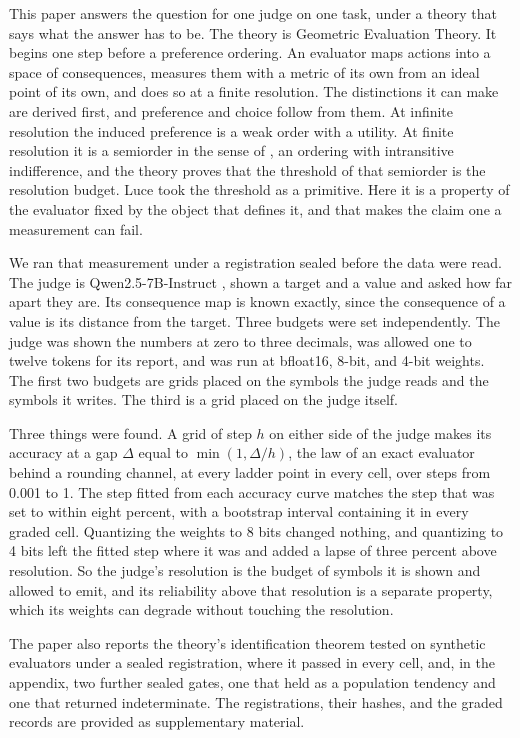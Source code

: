 \documentclass{article}
\theoremstyle{definition}
\theoremstyle{remark}
\begin{document}
This paper answers the question for one judge on one task, under a theory that says what the answer has to be.
The theory is Geometric Evaluation Theory.
It begins one step before a preference ordering.
An evaluator maps actions into a space of consequences, measures them with a metric of its own from an ideal point of its own, and does so at a finite resolution.
The distinctions it can make are derived first, and preference and choice follow from them.
At infinite resolution the induced preference is a weak order with a utility.
At finite resolution it is a semiorder in the sense of \citet{luce1956}, an ordering with intransitive indifference, and the theory proves that the threshold of that semiorder is the resolution budget.
Luce took the threshold as a primitive.
Here it is a property of the evaluator fixed by the object that defines it, and that makes the claim one a measurement can fail.

We ran that measurement under a registration sealed before the data were read.
The judge is Qwen2.5-7B-Instruct \citep{qwen2025}, shown a target and a value and asked how far apart they are.
Its consequence map is known exactly, since the consequence of a value is its distance from the target.
Three budgets were set independently.
The judge was shown the numbers at zero to three decimals, was allowed one to twelve tokens for its report, and was run at bfloat16, 8-bit, and 4-bit weights.
The first two budgets are grids placed on the symbols the judge reads and the symbols it writes.
The third is a grid placed on the judge itself.

Three things were found.
A grid of step $h$ on either side of the judge makes its accuracy at a gap $\Delta$ equal to $\min(1,\Delta/h)$, the law of an exact evaluator behind a rounding channel, at every ladder point in every cell, over steps from 0.001 to 1.
The step fitted from each accuracy curve matches the step that was set to within eight percent, with a bootstrap interval containing it in every graded cell.
Quantizing the weights to 8 bits changed nothing, and quantizing to 4 bits left the fitted step where it was and added a lapse of three percent above resolution.
So the judge's resolution is the budget of symbols it is shown and allowed to emit, and its reliability above that resolution is a separate property, which its weights can degrade without touching the resolution.

The paper also reports the theory's identification theorem tested on synthetic evaluators under a sealed registration, where it passed in every cell, and, in the appendix, two further sealed gates, one that held as a population tendency and one that returned indeterminate.
The registrations, their hashes, and the graded records are provided as supplementary material.
\end{document}
